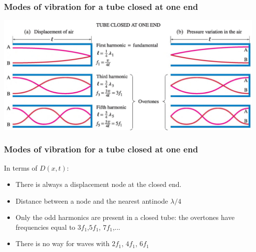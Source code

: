 \documentclass[]{beamer}
\begin{document}

\begin{frame}
\frametitle{Modes of vibration for a tube closed at one end}

  \begin{center}
  \includegraphics[height=2.in]{images4/tubeclose.jpg}
\end{center}


  \end{frame}



\begin{frame}
\frametitle{Modes of vibration for a tube closed at one end}

In terms of $D(x,t)$:
\vspace{3mm}

\begin{itemize}
\item There is always a displacement node at the closed end.
\pause
 
\item Distance between a node and the nearest antinode $\lambda/4$
\pause

\item Only the odd harmonics are present in a closed tube: the overtones have frequencies equal to $3f_1$,$5f_1$, $7f_1$,...
\pause

\item  There is no way for waves with $2f_1$, $4f_1$, $6f_1$


\end{itemize}



  \end{frame}




\end{document}
